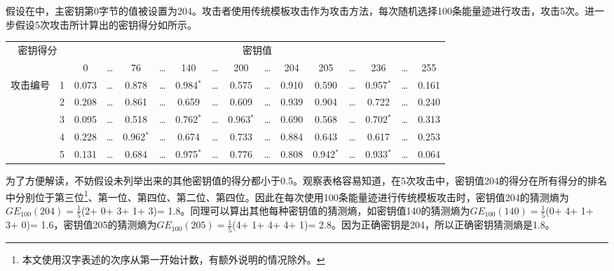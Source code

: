 {	\begin{example}\label{ex:badge}
		假设在中，主密钥第0字节的值被设置为204。攻击者使用传统模板攻击作为攻击方法，每次随机选择100条能量迹进行攻击，攻击5次。进一步假设5次攻击所计算出的密钥得分如所示。
		
		\begin{table}[!h]
			\label{tab:scoredemo}
			\scriptsize{
				\begin{tabular}{cc|cccccccccccccc}
					\hline
					\multicolumn{2}{c|}{\multirow{2}{*}{密钥得分}} & \multicolumn{14}{c}{密钥值} \\
					\multicolumn{2}{c|}{}
					    &     0 & \dots &    76 & \dots &   140 & \dots &   200 & \dots &   204 &   205 & \dots &   236 & \dots &   255\\
					\hline
					\multirow{5}{*}{攻击编号} 
					& 1 & 0.073 & \dots & 0.878 & \dots & 0.984$^*$ & \dots & 0.575 & \dots & 0.910 & 0.590 & \dots & 0.957$^*$ & \dots & 0.161\\
					
					& 2 & 0.208 & \dots & 0.861 & \dots & 0.659 & \dots & 0.609 & \dots & 0.939 & 0.904 & \dots & 0.722 & \dots & 0.240\\
					
					& 3 & 0.095 & \dots & 0.518 & \dots & 0.762$^*$ & \dots & 0.963$^*$ & \dots & 0.690 & 0.568 & \dots & 0.702$^*$ & \dots & 0.313\\
					
					& 4 & 0.228 & \dots & 0.962$^*$ & \dots & 0.674 & \dots & 0.733 & \dots & 0.884 & 0.643 & \dots & 0.617 & \dots & 0.253\\
					
					& 5 & 0.131 & \dots & 0.684 & \dots & 0.975$^*$ & \dots & 0.776 & \dots & 0.808 & 0.942$^*$ & \dots & 0.933$^*$ & \dots & 0.064\\
					
					\hline
				\end{tabular}
			}
		\end{table}
	
		为了方便解读，不妨假设未列举出来的其他密钥值的得分都小于0.5。观察表格容易知道，在5次攻击中，密钥值204的得分在所有得分的排名中分别位于第三位\footnote{本文使用汉字表述的次序从第一开始计数，有额外说明的情况除外。}、第一位、第四位、第二位、第四位。因此在每次使用100条能量迹进行传统模板攻击时，密钥值204的猜测熵为$GE_{100}(204)=\frac15$(2+ 0+ 3+ 1+ 3)= 1.8。同理可以算出其他每种密钥值的猜测熵，如密钥值140的猜测熵为$GE_{100}(140)=\frac15$(0+ 4+ 1+ 3+ 0)= 1.6，密钥值205的猜测熵为$GE_{100}(205)=\frac15$(4+ 1+ 4+ 4+ 1)= 2.8。因为正确密钥是204，所以正确密钥猜测熵是1.8。
	\end{example}
}
